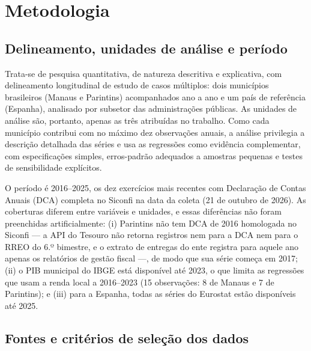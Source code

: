 \section{Metodologia}\label{sec:metodo}

\subsection{Delineamento, unidades de análise e período}

Trata-se de pesquisa quantitativa, de natureza descritiva e explicativa, com delineamento longitudinal de estudo de casos múltiplos: dois municípios brasileiros (Manaus e Parintins) acompanhados ano a ano e um país de referência (Espanha), analisado por subsetor das administrações públicas. As unidades de análise são, portanto, apenas as três atribuídas no trabalho. Como cada município contribui com no máximo dez observações anuais, a análise privilegia a descrição detalhada das séries e usa as regressões como evidência complementar, com especificações simples, erros-padrão adequados a amostras pequenas e testes de sensibilidade explícitos.

O período é 2016--2025, os dez exercícios mais recentes com Declaração de Contas Anuais (DCA) completa no Siconfi na data da coleta (21 de outubro de 2026). As coberturas diferem entre variáveis e unidades, e essas diferências não foram preenchidas artificialmente: (i) Parintins não tem DCA de 2016 homologada no Siconfi --- a API do Tesouro não retorna registros nem para a DCA nem para o RREO do 6.º bimestre, e o extrato de entregas do ente registra para aquele ano apenas os relatórios de gestão fiscal ---, de modo que sua série começa em 2017; (ii) o PIB municipal do IBGE está disponível até 2023, o que limita as regressões que usam a renda local a 2016--2023 (15 observações: 8 de Manaus e 7 de Parintins); e (iii) para a Espanha, todas as séries do Eurostat estão disponíveis até 2025.

\subsection{Fontes e critérios de seleção dos dados}

